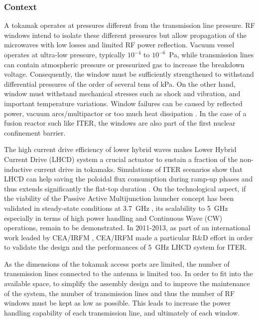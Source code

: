 \subsubsection{Context}
A tokamak operates at pressures different from the transmission line pressure. RF windows intend to isolate these different pressures but allow propagation of the microwaves with low losses and limited RF power reflection. Vacuum vessel operates at ultra-low pressure, typically $10^{-4}$ to $10^{-6}$~\si{Pa}, while transmission lines can contain atmospheric pressure or pressurized gas to increase the breakdown voltage. Consequently, the window must be sufficiently strengthened to withstand differential pressures of the order of several tens of \si{kPa}. On the other hand, window must withstand mechanical stresses such as shock and vibration, and important temperature variations. Window failures can be caused by reflected power, vacuum arcs/multipactor or too much heat dissipation . In the case of a fusion reactor such like ITER, the windows are also part of the first nuclear confinement barrier.

The high current drive efficiency of lower hybrid waves makes Lower Hybrid Current Drive (LHCD) system a crucial actuator to sustain a fraction of the non-inductive current drive in tokamaks. Simulations of ITER scenarios show that LHCD can help saving the poloidal flux consumption during ramp-up phases and thus extends significantly the flat-top duration . On the technological aspect, if the viability of the Passive Active Multijunction launcher concept has been validated in steady-state conditions at 3.7~\si{GHz} , its scalability to 5~\si{GHz} especially in terms of high power handling and Continuous Wave (CW) operations, remain to be demonstrated. In 2011-2013, as part of an international work leaded by CEA/IRFM , CEA/IRFM made a particular R\&D effort in order to validate the design and the performances of 5~\si{GHz} LHCD system for ITER. 


As the dimensions of the tokamak access ports are limited, the number of transmission lines connected to the antenna is limited too. In order to fit into the available space, to simplify the assembly design and to improve the maintenance of the system, the number of transmission lines and thus the number of RF windows must be kept as low as possible. This leads to increase the power handling capability of each transmission line, and ultimately of each window.

